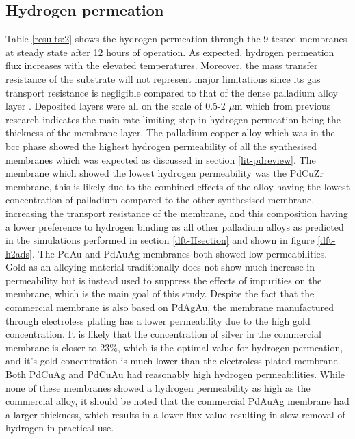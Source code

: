 \subsection{Hydrogen permeation}
Table \ref{results:2} shows the hydrogen permeation through the 9 tested membranes at steady state after 12 hours of operation. As expected, hydrogen permeation flux increases with the elevated temperatures. Moreover, the mass transfer resistance of the substrate will not represent major limitations since its gas transport resistance is negligible compared to that of the dense palladium alloy layer \cite{GouveiaGil2015}. Deposited layers were all on the scale of 0.5-2 $\mu$m which from previous research indicates the main rate limiting step in hydrogen permeation being the thickness of the membrane layer. \cite{NathanW.Ockwig2007a} The palladium copper alloy which was in the bcc phase showed the highest hydrogen permeability of all the synthesised membranes which was expected as discussed in section \ref{lit-pdreview}. The membrane which showed the lowest hydrogen permeability was the PdCuZr membrane, this is likely due to the combined effects of the alloy having the lowest concentration of palladium compared to the other synthesised membrane, increasing the transport resistance of the membrane, and this composition having a lower preference to hydrogen binding as all other palladium alloys as predicted in the simulations performed in section \ref{dft-Hsection} and shown in figure \ref{dft-h2ads}. The PdAu and PdAuAg membranes both showed low permeabilities. Gold as an alloying material traditionally does not show much increase in permeability \cite{Chen2010}  but is instead used to suppress the effects of impurities on the membrane, \cite{Chen2010} which is the main goal of this study. Despite the fact that the commercial membrane is also based on PdAgAu, the membrane manufactured through electroless plating has a lower permeability due to the high gold concentration. It is likely that the concentration of silver in the commercial membrane is closer to 23\%, which is the optimal value for hydrogen permeation, and it’s gold concentration is much lower than the electroless plated membrane. Both PdCuAg and PdCuAu had reasonably high hydrogen permeabilities. While none of these membranes showed a hydrogen permeability as high as the commercial alloy, it should be noted that the commercial PdAuAg membrane had a larger thickness, which results in a lower flux value resulting in slow removal of hydrogen in practical use.

